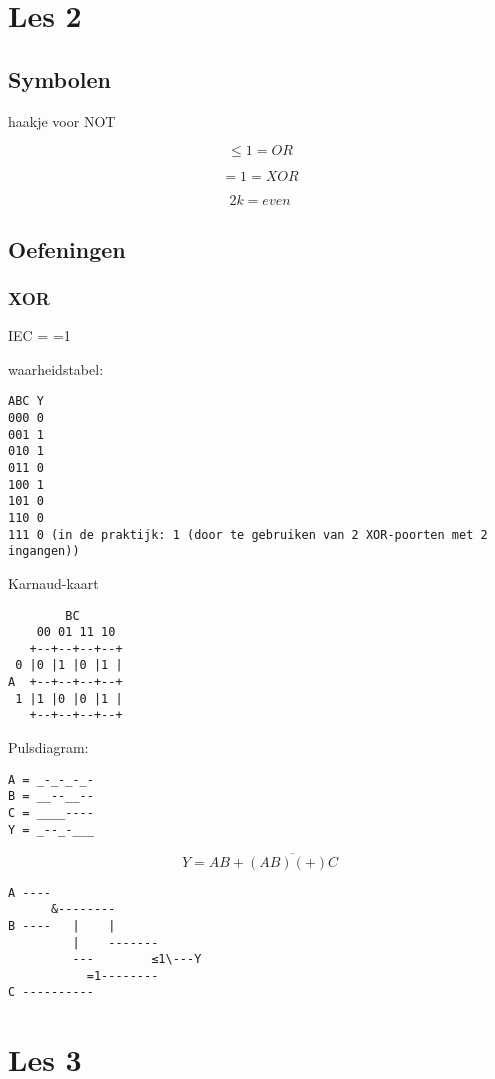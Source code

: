 \documentclass[11pt, a4paper]{article}
\begin{document}
\newpage

\section{Les 2}

\subsection{Symbolen}

haakje voor NOT


$$\le1 = OR$$

$$=1 = XOR$$

$$2k = even$$

\subsection{Oefeningen}

\subsubsection{XOR}

IEC = =1

waarheidstabel:

\begin{verbatim}
ABC Y
000 0
001 1
010 1
011 0
100 1
101 0
110 0
111 0 (in de praktijk: 1 (door te gebruiken van 2 XOR-poorten met 2 ingangen))
\end{verbatim}

Karnaud-kaart

\begin{verbatim}
        BC
    00 01 11 10
   +--+--+--+--+
 0 |0 |1 |0 |1 |
A  +--+--+--+--+
 1 |1 |0 |0 |1 |
   +--+--+--+--+
\end{verbatim}

Pulsdiagram:

\begin{verbatim}
A = _-_-_-_-
B = __--__--
C = ____----
Y = _--_-___
\end{verbatim}

$$Y=AB+\overline{(AB)(+)C}$$

\begin{verbatim}
A ----
      &--------
B ----   |    |
         |    -------
         ---        ≤1\---Y
           =1--------
C ----------
\end{verbatim}

\newpage

\section{Les 3}
\end{document}
